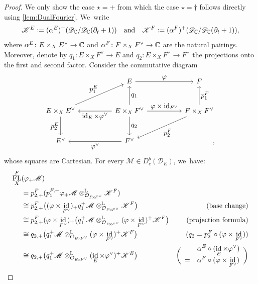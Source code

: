 \documentclass[11pt]{article}
\let\ts\textstyle
\newcommand{\quand}{\quad\text{and}\quad}
\DeclareMathOperator{\FL}{\textup{FL}}
\DeclareMathOperator{\id}{\textup{id}}
\begin{document}
\begin{proof}
We only show the case $\star=+$ from which the case $\star=\dag$ follows directly using \cref{lem:DualFourier}. We~write
\[
\mathscr K^E := (\alpha^E)^+(\mathscr D_\C/\mathscr D_\C(\partial_t+1))\quand \mathscr K^F := (\alpha^F)^+(\mathscr D_\C/\mathscr D_\C(\partial_t+1)),
\]
where $\alpha^E \colon E \times_X E^\vee \to {\mathbb C}$ and $\alpha^F \colon F \times_X F^\vee \to {\mathbb C}$ are the natural pairings. Moreover, denote by $q_1 \colon E \times_X F^\vee \to E$ and $q_2 \colon E \times_X F^\vee \to F^\vee$ the projections onto the first and second factor. Consider the commutative diagram
\[
\begin{tikzcd}[column sep=huge, row sep=large]
&
E \ar{r}{\ts \ts \varphi}
& F
\\
E \times_X E^\vee \ar{ur}{\ts p^E_1} \ar[swap]{d}{\ts \ts p^E_2}
& E \times_X F^\vee \ar{u}[swap]{\ts q_1} \ar{d}{\ts q_2} \ar{l}{\ts \id_E \times \varphi^\vee} \ar{r}{\ts \ts \varphi \times \id_{F^\vee}}
& F \times_X F^\vee \ar{dl}{\ts p_2^F} \ar[swap]{u}{\ts p_1^F}
\\
E^\vee
& F^\vee \ar{l}{\ts \varphi^\vee}
& \phantom{F \times_X F^\vee},
\end{tikzcd}
\]
whose squares are Cartesian. For every $\mathscr M \in D^b_{c}(\mathscr D_E)$, we~have:\vspace*{-5pt}
\begin{align*}
\FL_X^F&(\varphi_+ \mathscr M) & \\
&= p_{2,+}^F (p_1^{F,+} \varphi_+ \mathscr M \otimes^{\mathbb L}_{\O_{F\!\times\!F^\vee}} \mathscr K^F) & \\
&\cong p_{2,+}^F \big((\varphi \times \id_{F^\vee})_+ q_1^+ \mathscr M \otimes^{\mathbb L}_{\O_{F\!\times\!F^\vee}} \mathscr K^F\big) & \text{\small (base change)}\\
&\cong p_{2,+}^F (\varphi \times \id_{F^\vee})_+ \big(q_1^+ \mathscr M \otimes^{\mathbb L}_{\O_{E\!\times\!F^\vee}} (\varphi \times \id_{F^\vee})^+ \mathscr K^F\big) & \text{\small (projection formula)}\\
&\cong q_{2,+} \big(q_1^+ \mathscr M \otimes^{\mathbb L}_{\O_{E\!\times\!F^\vee}} (\varphi \times \id_{F^\vee})^+ \mathscr K^F\big) & \text{\small ($q_2 = p_2^F \circ (\varphi \times \id_{F^\vee})$)}\\
&\cong q_{2,+} \big(q_1^+ \mathscr M \otimes^{\mathbb L}_{\O_{E\!\times\!F^\vee}} (\id_E \times \varphi^\vee)^+ \mathscr K^E\big) & \text{\small $\biggl(\begin{array}{rl}&\alpha^E \circ (\id_E \times \varphi^\vee)\\=& \alpha^F \circ (\varphi \times \id_{F^\vee})\end{array}\biggr)$}\\

\end{align*}
\end{proof}
\end{document}

